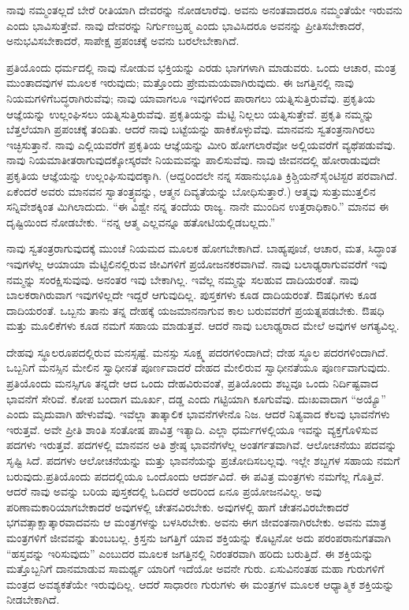 ನಾವು ನಮ್ಮಂತಲ್ಲದೆ ಬೇರೆ ರೀತಿಯಾಗಿ ದೇವರನ್ನು ನೋಡಲಾರೆವು. ಅವನು ಅನಂತವಾದರೂ ನಮ್ಮಂತೆಯೇ ಇರುವನು ಎಂದು ಭಾವಿಸುತ್ತೇವೆ. ನಾವು ದೇವರನ್ನು ನಿರ್ಗುಣಬ್ರಹ್ಮ ಎಂದು ಭಾವಿಸಿದರೂ ಅವನನ್ನು ಪ್ರೀತಿಸಬೇಕಾದರೆ, ಅನುಭವಿಸಬೇಕಾದರೆ, ಸಾಪೇಕ್ಷ ಪ್ರಪಂಚಕ್ಕೆ ಅವನು ಬರಲೇಬೇಕಾಗಿದೆ.

ಪ್ರತಿಯೊಂದು ಧರ್ಮದಲ್ಲಿ ನಾವು ನೋಡುವ ಭಕ್ತಿಯನ್ನು ಎರಡು ಭಾಗಗಳಾಗಿ ಮಾಡುವರು. ಒಂದು ಆಚಾರ, ಮಂತ್ರ ಮುಂತಾದವುಗಳ ಮೂಲಕ ಇರುವುದು; ಮತ್ತೊಂದು ಪ್ರೇಮಮಯವಾಗಿರುವುದು. ಈ ಜಗತ್ತಿನಲ್ಲಿ ನಾವು ನಿಯಮಗಳಿಗೆ\break ಬದ್ಧರಾಗಿರುವೆವು; ನಾವು ಯಾವಾಗಲೂ ಇವುಗಳಿಂದ ಪಾರಾಗಲು ಯತ್ನಿಸುತ್ತಿರುವೆವು. ಪ್ರಕೃತಿಯ ಆಜ್ಞೆಯನ್ನು ಉಲ್ಲಂಘಿಸಲು ಯತ್ನಿಸುತ್ತಿರುವೆವು. ಪ್ರಕೃತಿಯನ್ನು ಮೆಟ್ಟಿ ನಿಲ್ಲಲು ಯತ್ನಿಸುತ್ತೇವೆ. ಪ್ರಕೃತಿ ನಮ್ಮನ್ನು ಬೆತ್ತಲೆಯಾಗಿ ಪ್ರಪಂಚಕ್ಕೆ ತಂದಿತು. ಆದರೆ ನಾವು ಬಟ್ಟೆಯನ್ನು ಹಾಕಿಕೊಳ್ಳುವೆವು. ಮಾನವನು ಸ್ವತಂತ್ರನಾಗಿರಲು ಇಚ್ಛಿಸುತ್ತಾನೆ. ನಾವು ಎಲ್ಲಿಯವರೆಗೆ ಪ್ರಕೃತಿಯ ಆಜ್ಞೆಯನ್ನು ಮೀರಿ ಹೋಗಲಾರೆವೋ ಅಲ್ಲಿಯವರೆಗೆ ವ್ಯಥೆಪಡುವೆವು. ನಾವು ನಿಯಮಾತೀತರಾಗುವುದಕ್ಕೋಸ್ಕರವೇ ನಿಯಮವನ್ನು ಪಾಲಿಸುವೆವು. ನಾವು ಜೀವನದಲ್ಲಿ ಹೋರಾಡುವುದೇ ಪ್ರಕೃತಿಯ ಆಜ್ಞೆಯನ್ನು ಉಲ್ಲಂಘಿಸುವುದಕ್ಕಾಗಿ. (ಆದ್ದರಿಂದಲೇ ನನ್ನ ಸಹಾನುಭೂತಿ ಕ್ರಿಶ್ಚಿಯನ್​ ಸೈಂಟಿಸ್ಟರ ಪರವಾಗಿದೆ. ಏಕೆಂದರೆ ಅವರು ಮಾನವನ ಸ್ವಾತಂತ್ರ್ಯವನ್ನು, ಆತ್ಮನ ದಿವ್ಯತೆಯನ್ನು ಬೋಧಿಸುತ್ತಾರೆ.) ಆತ್ಮವು ಸುತ್ತುಮುತ್ತಲಿನ ಸನ್ನಿವೇಶಕ್ಕಿಂತ ಮಿಗಿಲಾದುದು. “ಈ ವಿಶ್ವೇ ನನ್ನ ತಂದೆಯ ರಾಜ್ಯ. ನಾನೇ ಮುಂದಿನ ಉತ್ತರಾಧಿಕಾರಿ.” ಮಾನವ ಈ ದೃಷ್ಟಿಯಿಂದ ನೋಡಬೇಕು. “ನನ್ನ ಆತ್ಮ ಎಲ್ಲವನ್ನೂ ಹತೋಟಿಯಲ್ಲಿಡಬಲ್ಲದು.”

ನಾವು ಸ್ವತಂತ್ರರಾಗುವುದಕ್ಕೆ ಮುಂಚೆ ನಿಯಮದ ಮೂಲಕ ಹೋಗಬೇಕಾಗಿದೆ. ಬಾಹ್ಯಪೂಜೆ, ಆಚಾರ, ಮತ, ಸಿದ್ಧಾಂತ ಇವುಗಳೆಲ್ಲ ಆಯಾಯಾ ಮೆಟ್ಟಿಲಿನಲ್ಲಿರುವ ಜೀವಿಗಳಿಗೆ ಪ್ರಯೋಜನಕರವಾಗಿವೆ. ನಾವು ಬಲಾಢ್ಯರಾಗುವವರೆಗೆ ಇವು ನಮ್ಮನ್ನು ಸಂರಕ್ಷಿಸುವುವು. ಅನಂತರ ಇವು ಬೇಕಾಗಿಲ್ಲ. ಇವೆಲ್ಲ ನಮ್ಮನ್ನು ಸಲಹುವ ದಾದಿಯರಂತೆ. ನಾವು ಬಾಲಕರಾಗಿರುವಾಗ ಇವುಗಳಿಲ್ಲದೇ ಇದ್ದರೆ ಆಗುವುದಿಲ್ಲ. ಪುಸ್ತಕಗಳು ಕೂಡ ದಾದಿಯರಂತೆ. ಔಷಧಿಗಳು ಕೂಡ ದಾದಿಯರಂತೆ. ಒಬ್ಬನು ತಾನು ತನ್ನ ದೇಹಕ್ಕೆ ಯಜಮಾನನಾಗುವ ಕಾಲ ಬರುವವರೆಗೆ ಪ್ರಯತ್ನಪಡಬೇಕು. ಔಷಧಿ ಮತ್ತು ಮೂಲಿಕೆಗಳು ಕೂಡ ನಮಗೆ ಸಹಾಯ ಮಾಡುತ್ತವೆ. ಆದರೆ ನಾವು ಬಲಾಢ್ಯರಾದ ಮೇಲೆ ಅವುಗಳ ಅಗತ್ಯವಿಲ್ಲ.

ದೇಹವು ಸ್ಥೂಲರೂಪದಲ್ಲಿರುವ ಮನಸ್ಸಷ್ಟೆ. ಮನಸ್ಸು ಸೂಕ್ಷ್ಮ ಪದರಗಳಿಂದಾಗಿದೆ; ದೇಹ ಸ್ಥೂಲ ಪದರಗಳಿಂದಾಗಿದೆ. ಒಬ್ಬನಿಗೆ ಮನಸ್ಸಿನ ಮೇಲಿನ ಸ್ವಾಧೀನತೆ ಪೂರ್ಣ\-ವಾದರೆ ದೇಹದ ಮೇಲಿರುವ ಸ್ವಾಧೀನತೆಯೂ ಪೂರ್ಣವಾಗುವುದು. ಪ್ರತಿಯೊಂದು ಮನಸ್ಸಿಗೂ ತನ್ನದೇ ಆದ ಒಂದು ದೇಹವಿರುವಂತೆ, ಪ್ರತಿಯೊಂದು ಶಬ್ದವೂ ಒಂದು ನಿರ್ದಿಷ್ಟವಾದ ಭಾವನೆಗೆ ಸೇರಿವೆ. ಕೋಪ ಬಂದಾಗ ಮೂರ್ಖ, ದಡ್ಡ ಎಂದು ಗಟ್ಟಿಯಾಗಿ ಕೂಗುವೆವು. ದುಃಖವಾದಾಗ “ಅಯ್ಯೊ” ಎಂದು ಮೃದುವಾಗಿ ಹೇಳುವೆವು. ಇವೆಲ್ಲಾ ತಾತ್ಕಾಲಿಕ ಭಾವನೆಗಳೇನೊ ನಿಜ. ಆದರೆ ನಿತ್ಯವಾದ ಕೆಲವು ಭಾವನೆಗಳು ಇರುತ್ತವೆ. ಅವೇ ಪ್ರೀತಿ ಶಾಂತಿ ಸಂತೋಷ ಪಾವಿತ್ರ ಇತ್ಯಾದಿ. ಎಲ್ಲಾ ಧರ್ಮಗಳಲ್ಲಿಯೂ ಇವನ್ನು ವ್ಯಕ್ತಗೊಳಿಸುವ ಪದಗಳು ಇರುತ್ತವೆ. ಪದಗಳಲ್ಲಿ ಮಾನವನ ಅತಿ ಶ್ರೇಷ್ಠ ಭಾವನೆಗಳೆಲ್ಲ ಅಂತರ್ಗತವಾಗಿವೆ. ಆಲೋಚನೆಯು ಪದವನ್ನು ಸೃಷ್ಟಿ ಸಿದೆ. ಪದಗಳು ಆಲೋಚನೆಯನ್ನು ಮತ್ತು ಭಾವನೆಯನ್ನು ಪ್ರಚೋದಿಸಬಲ್ಲವು. ಇಲ್ಲೇ ಶಬ್ದಗಳ ಸಹಾಯ ನಮಗೆ ಬರುವುದು.\break ಪ್ರತಿಯೊಂದು ಪದದಲ್ಲಿಯೂ ಒಂದೊಂದು ಆದರ್ಶವಿದೆ. ಈ ಪವಿತ್ರ ಮಂತ್ರಗಳು ನಮಗೆಲ್ಲ ಗೊತ್ತಿವೆ. ಆದರೆ ನಾವು ಅವನ್ನು ಬರಿಯ ಪುಸ್ತಕದಲ್ಲಿ ಓದಿದರೆ ಅದರಿಂದ ಏನೂ ಪ್ರಯೋಜನವಿಲ್ಲ. ಅವು ಪರಿಣಾಮಕಾರಿಯಾಗಬೇಕಾದರೆ ಅವುಗಳಲ್ಲಿ ಚೇತನವಿರಬೇಕು. ಅವುಗಳಲ್ಲಿ ಹಾಗೆ ಚೇತನವಿರಬೇಕಾದರೆ ಭಗವತ್ಸಾಕ್ಷಾತ್ಕಾರವಾದವನು ಆ ಮಂತ್ರಗಳನ್ನು ಬಳಸಿರಬೇಕು. ಅವನು ಈಗ ಜೀವಂತನಾಗಿರಬೇಕು. ಅವನು ಮಾತ್ರ ಮಂತ್ರಗಳಿಗೆ ಜೀವವನ್ನು ತುಂಬಬಲ್ಲ. ಕ್ರಿಸ್ತನು ಜಗತ್ತಿಗೆ ಯಾವ ಶಕ್ತಿಯನ್ನು ಕೊಟ್ಟನೋ ಅದು ಪರಂಪರಾನುಗತವಾಗಿ “ಹಸ್ತವನ್ನು ಇರಿಸುವುದು” ಎಂಬುದರ ಮೂಲಕ ಜಗತ್ತಿನಲ್ಲಿ ನಿರಂತರವಾಗಿ ಹರಿದು ಬರುತ್ತಿದೆ. ಈ ಶಕ್ತಿಯನ್ನು ಮತ್ತೊಬ್ಬನಿಗೆ ದಾನಮಾಡುವ ಸಾಮರ್ಥ್ಯ ಯಾರಿಗೆ ಇದೆಯೋ ಅವನೇ ಗುರು. ಏಸುವಿನಂತಹ ಮಹಾ ಗುರುಗಳಿಗೆ ಮಂತ್ರದ ಅವಶ್ಯಕತೆಯೇ ಇರುವುದಿಲ್ಲ. ಆದರೆ ಸಾಧಾರಣ ಗುರುಗಳು ಈ ಮಂತ್ರಗಳ ಮೂಲಕ ಆಧ್ಯಾತ್ಮಿಕ ಶಕ್ತಿಯನ್ನು ನೀಡಬೇಕಾಗಿದೆ.

